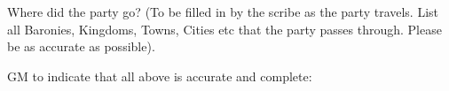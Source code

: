 {\begin{minipage}{\linewidth}
\bigskip

Where did the party go?  (To be filled in by  the scribe as the  party
travels.   List all Baronies,  Kingdoms,  Towns,  Cities etc that  the
party passes through.  Please be as accurate as possible).

\vspace{30em}

GM to indicate that all above is accurate and complete:
\end{minipage}
}
